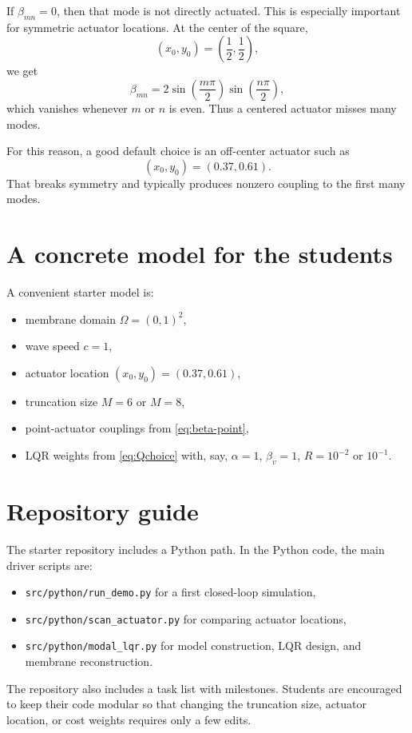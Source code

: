 \documentclass[11pt]{article}
\begin{document}
If $\beta_{mn}=0$, then that mode is not directly actuated. This is 
especially important for symmetric actuator locations. At the center of 
the square,
\[
(x_0,y_0)=\left(\frac12,\frac12\right),
\]
we get
\[
\beta_{mn}=2\sin\left(\frac{m\pi}{2}\right)\sin\left(\frac{n\pi}{2}\right),
\]
which vanishes whenever $m$ or $n$ is even. Thus a centered actuator 
misses many modes.

For this reason, a good default choice is an off-center actuator such 
as
\[
(x_0,y_0)=(0.37,0.61).
\]
That breaks symmetry and typically produces nonzero coupling to the 
first many modes.

\section{A concrete model for the students}
A convenient starter model is:
\begin{itemize}[leftmargin=1.5em]
\item membrane domain $\Omega=(0,1)^2$,
\item wave speed $c=1$,
\item actuator location $(x_0,y_0)=(0.37,0.61)$,
\item truncation size $M=6$ or $M=8$,
\item point-actuator couplings from \eqref{eq:beta-point},
\item LQR weights from \eqref{eq:Qchoice} with, say, $\alpha=1$, 
$\beta_v=1$, $R=10^{-2}$ or $10^{-1}$.
\end{itemize}

\section{Repository guide}
The starter repository includes a Python path.
In the Python code, the main driver scripts are:
\begin{itemize}[leftmargin=1.5em]
\item \texttt{src/python/run\_demo.py} for a first closed-loop 
simulation,
\item \texttt{src/python/scan\_actuator.py} for comparing actuator 
locations,
\item \texttt{src/python/modal\_lqr.py} for model construction, 
LQR design, and membrane reconstruction.
\end{itemize}
The repository also includes a task list with milestones. Students 
are encouraged to keep their code modular so that changing the 
truncation size, actuator location, or cost weights requires only a 
few edits.
\end{document}
